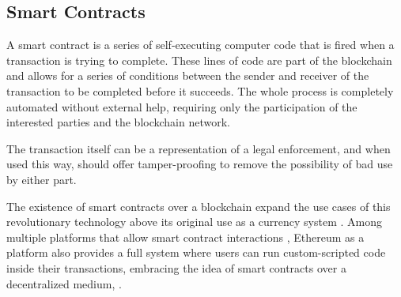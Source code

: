 \subsection{Smart Contracts}

A smart contract is a series of self-executing computer code that is fired when a transaction is trying to complete. These lines of code are part of the blockchain and allows for a series of conditions between the sender and receiver of the transaction to be completed before it succeeds. The whole process is completely automated without external help, requiring only the participation of the interested parties and the blockchain network.

The transaction itself can be a representation of a legal enforcement, and when used this way, should offer tamper-proofing to remove the possibility of bad use by either part. \cite{templates}

The existence of smart contracts over a blockchain expand the use cases of this revolutionary technology above its original use as a currency system \cite{nakamoto} \cite{uses}. Among multiple platforms that allow smart contract interactions \cite{sense}\cite{lazy}, Ethereum \cite{ethereum } as a platform also provides a full system where users can run custom-scripted code inside their transactions, embracing the idea of smart contracts over a decentralized medium, \cite{hawk}.


